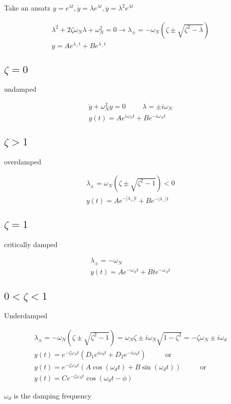 \documentclass[fleqn]{report}
\newcommand{\hp}{\hspace{1cm}}
\newcommand{\equations} [1] {
\begin{gather*}
#1
\end{gather*}
}
\begin{document}
Take an ansatz $y = e^{\lambda t}, \dot y = \lambda e^{\lambda t}, \ddot y = \lambda^2 e^{\lambda t}$

\equations{
    \lambda^2 + 2 \zeta \omega_N \lambda + \omega_N^2 = 0
    \rightarrow 
    \lambda_\pm = -\omega_N(\zeta \pm \sqrt{\zeta^2 - \lambda})
    \\
    y = A e^{\lambda_+ t} + B e^{\lambda_- t}
}

\subsection{$\zeta = 0$}
undamped
\equations{
    \ddot y + \omega^2_N y = 0 \hp \lambda = \pm i \omega_N
    \\
    y(t) = 
    A e^{i \omega_N t} + B e^{-i \omega_N t}
}


\subsection{$\zeta > 1$}
overdamped 

\equations{
    \lambda_\pm = \omega_N(\zeta \pm \sqrt{\zeta^2 - 1}) < 0
    \\
    y(t) = 
    A e^{-|\lambda_+|t} + Be^{-|\lambda_-| t}
}

\subsection{$\zeta = 1$}
critically damped 

\equations{
    \lambda_\pm = - \omega_N
    \\
    y(t) = 
    A e^{- \omega_N t} + Bt e^{- \omega_N t}
}


\subsection{$0 < \zeta < 1$}
Underdamped

\equations{
    \lambda_\pm = -\omega_N (\zeta \pm \sqrt{\zeta^2 - 1})
    =
    \omega_N \zeta \pm i \omega_N \sqrt{1 - \zeta^2}
    =
    - \zeta \omega_N \pm i \omega_d
    \\
    y(t) = e^{-\zeta \omega_N t} (D_1 e^{i \omega_d t} + D_2 e^{-i \omega_d t})
    \hp 
    \textrm{ or }
    \\
    y(t) = e^{-\zeta \omega_N t} (A \cos(\omega_d t) + B \sin(\omega_d t))
    \hp 
    \textrm{ or }
    \\
    y(t) = Ce^{- \zeta \omega_N t} \cos(\omega_d t - \phi)
}
$\omega_d$ is the damping frequency 
\end{document}
